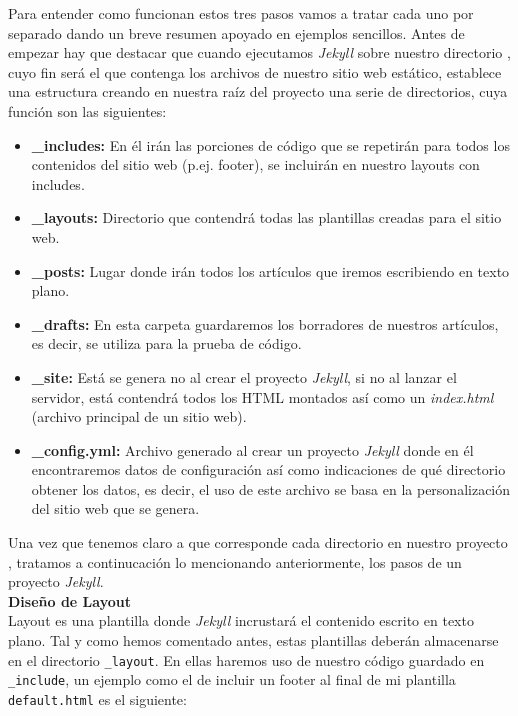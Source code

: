 Para entender como funcionan estos tres pasos vamos a tratar cada uno por separado dando un  breve resumen apoyado en ejemplos sencillos. Antes de empezar hay que destacar que cuando ejecutamos \emph{Jekyll} sobre nuestro directorio , cuyo fin será el que contenga los archivos de nuestro sitio web estático, establece una estructura creando en nuestra raíz del proyecto una serie de directorios, cuya función son las siguientes:\\
\begin{itemize}
    \item[] \textbf{\_includes:} En él irán las porciones de código que se repetirán para todos los contenidos del sitio web (p.ej. footer), se incluirán en nuestro layouts con includes.
    \item[] \textbf{\_layouts:} Directorio que contendrá todas las plantillas creadas para el sitio web.
    \item[] \textbf{\_posts:} Lugar donde irán todos los artículos que iremos escribiendo en texto plano.
    \item[] \textbf{\_drafts:} En esta carpeta guardaremos los borradores de nuestros artículos, es decir, se utiliza para la prueba de código.
    \item[] \textbf{\_site:} Está se genera no al crear el proyecto \emph{Jekyll}, si no al lanzar el servidor, está contendrá todos los HTML montados así como un \textit{index.html} (archivo principal de un sitio web).
    \item[] \textbf{\_config.yml:} Archivo generado al crear un proyecto \emph{Jekyll} donde en él encontraremos datos de configuración así como indicaciones de qué directorio obtener los datos, es decir, el uso de este archivo se basa en la personalización del sitio web que se genera. 
\end{itemize}
Una vez que tenemos claro a que corresponde cada directorio en nuestro proyecto , tratamos a continucación lo mencionando anteriormente, los pasos  de un proyecto \emph{Jekyll}. \\

\textbf{\large{Diseño de Layout}} \\
Layout es una plantilla donde \emph{Jekyll} incrustará el contenido escrito en texto plano. Tal y como hemos comentado antes, estas plantillas deberán almacenarse en el directorio \texttt{\_layout}. En ellas  haremos uso de nuestro código guardado en \texttt{\_include}, un ejemplo como el de incluir un footer al final de mi plantilla \texttt{default.html} es el siguiente:

